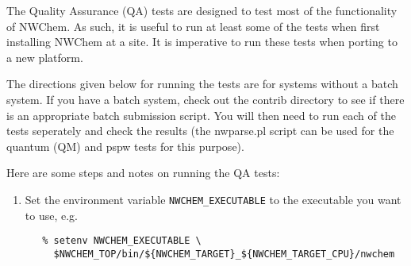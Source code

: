 \label{sec:testing}
The Quality Assurance (QA) tests are designed to test most of
the functionality of NWChem.  As such, it is useful to run at least
some of the tests when first installing NWChem at a site.  It is
imperative to run these tests when porting to a new platform.

The directions given below for running the tests are for systems without
a batch system.  If you have a batch system, check out the contrib
directory to see if there is an appropriate batch submission script.
You will then need to run each of the tests seperately and check the
results (the nwparse.pl script can be used for the quantum (QM) and pspw 
tests for this purpose).

Here are some steps and notes on running the QA tests:

\begin{enumerate}
\item Set the environment variable \verb+NWCHEM_EXECUTABLE+ to the executable
   you want to use, e.g.
\begin{verbatim}
   % setenv NWCHEM_EXECUTABLE \
     $NWCHEM_TOP/bin/${NWCHEM_TARGET}_${NWCHEM_TARGET_CPU}/nwchem
\end{verbatim}


\end{enumerate}
